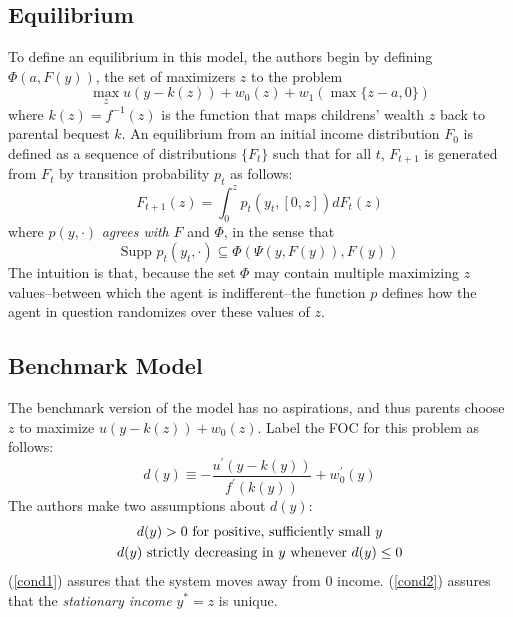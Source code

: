 \documentclass[11pt]{article}
\begin{document}
        \subsection{Equilibrium}
        To define an equilibrium in this model, the authors begin by defining \( \Phi(a, F(y)) \), the set of maximizers \( z \) to the problem
        \begin{equation}
            \max_z u\left( y - k(z) \right) + w_0(z) + w_1(\max\{z - a, 0\}) \label{problem}
        \end{equation}
        where \( k(z) = f^{-1}(z) \) is the function that maps childrens' wealth \( z \) back to parental bequest \( k \). An equilibrium from an initial income distribution \( F_0 \) is defined as a sequence of distributions \( \{F_t\} \) such that for all \( t \), \( F_{t+1} \) is generated from \( F_t \) by transition probability \( p_t \) as follows:
        \[F_{t + 1}(z) = \int_{0}^{z}p_t(y_t, [0, z])dF_t(z)\]
        where \( p(y, \cdot) \) \textit{agrees with} \( F \) and \( \Phi \), in the sense that 
        \[\text{Supp } p_t(y_t, \cdot) \subseteq \Phi\left( \Psi(y, F(y)), F(y) \right)\]
        The intuition is that, because the set \( \Phi \) may contain multiple maximizing \( z \) values--between which the agent is indifferent--the function \( p \) defines how the agent in question randomizes over these values of \( z \). 
        \subsection{Benchmark Model}
        The benchmark version of the model has no aspirations, and thus parents choose \( z \) to maximize \( u\left( y - k(z) \right) + w_0(z) \). Label the FOC for this problem as follows:
        \[d(y) \equiv -\frac{u^\prime\left( y - k(y) \right)}{f^\prime\left( k(y) \right)} + w_0^\prime(y)\]
        The authors make two assumptions about \( d(y) \):
        \begin{gather}
            d(y) > 0 \text{ for positive, sufficiently small \( y \)} \label{cond1} \\ 
            d(y)\text{ strictly decreasing in \( y \) whenever \( d(y)\leq 0 \)} \label{cond2}
        \end{gather}
        (\ref{cond1}) assures that the system moves away from 0 income. (\ref{cond2}) assures that the \textit{stationary income} \( y^* = z \) is unique. 
\end{document}
